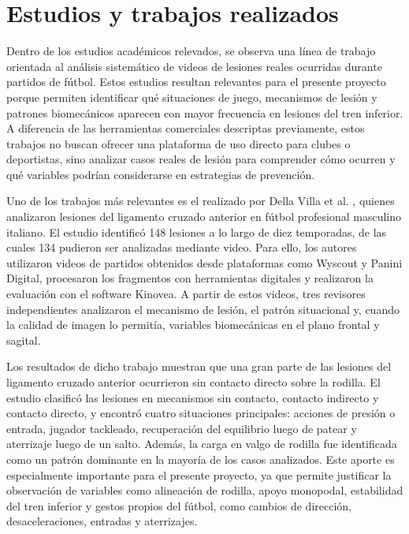\section{Estudios y trabajos realizados}

Dentro de los estudios académicos relevados, se observa una línea de trabajo orientada al
análisis sistemático de videos de lesiones reales ocurridas durante partidos de fútbol. Estos
estudios resultan relevantes para el presente proyecto porque permiten identificar qué
situaciones de juego, mecanismos de lesión y patrones biomecánicos aparecen con mayor
frecuencia en lesiones del tren inferior. A diferencia de las herramientas comerciales
descriptas previamente, estos trabajos no buscan ofrecer una plataforma de uso directo para
clubes o deportistas, sino analizar casos reales de lesión para comprender cómo ocurren y
qué variables podrían considerarse en estrategias de prevención.

Uno de los trabajos más relevantes es el realizado por Della Villa et al.
\parencite{DellaVillaEtAl2020}, quienes analizaron lesiones del ligamento cruzado anterior
en fútbol profesional masculino italiano. El estudio identificó 148 lesiones a lo largo de
diez temporadas, de las cuales 134 pudieron ser analizadas mediante video. Para ello, los
autores utilizaron videos de partidos obtenidos desde plataformas como Wyscout y Panini
Digital, procesaron los fragmentos con herramientas digitales y realizaron la evaluación con
el software Kinovea. A partir de estos videos, tres revisores independientes analizaron el
mecanismo de lesión, el patrón situacional y, cuando la calidad de imagen lo permitía,
variables biomecánicas en el plano frontal y sagital.

Los resultados de dicho trabajo muestran que una gran parte de las lesiones del ligamento
cruzado anterior ocurrieron sin contacto directo sobre la rodilla. El estudio clasificó las
lesiones en mecanismos sin contacto, contacto indirecto y contacto directo, y encontró
cuatro situaciones principales: acciones de presión o entrada, jugador tackleado,
recuperación del equilibrio luego de patear y aterrizaje luego de un salto. Además, la
carga en valgo de rodilla fue identificada como un patrón dominante en la mayoría de los
casos analizados. Este aporte es especialmente importante para el presente proyecto, ya que
permite justificar la observación de variables como alineación de rodilla, apoyo monopodal,
estabilidad del tren inferior y gestos propios del fútbol, como cambios de dirección,
desaceleraciones, entradas y aterrizajes.

